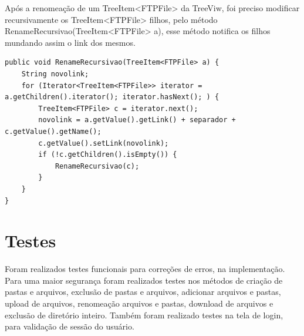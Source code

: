 \documentclass[12pt]{article}
\begin{document}
	Após a renomeação de um TreeItem<FTPFile> da TreeViw, foi preciso modificar recursivamente os TreeItem<FTPFile> filhos, pelo método RenameRecursivao(TreeItem<FTPFile> a), esse método notifica os filhos mundando assim o link dos mesmos.
\begin{lstlisting}
public void RenameRecursivao(TreeItem<FTPFile> a) {
	String novolink;
	for (Iterator<TreeItem<FTPFile>> iterator = a.getChildren().iterator(); iterator.hasNext(); ) {
		TreeItem<FTPFile> c = iterator.next();
		novolink = a.getValue().getLink() + separador + c.getValue().getName();
		c.getValue().setLink(novolink);
		if (!c.getChildren().isEmpty()) {
			RenameRecursivao(c);
		}
	}
}
\end{lstlisting}

\section{Testes}
Foram realizados testes funcionais para correções de erros, na implementação. Para uma maior segurança foram realizados testes nos métodos de criação de pastas e arquivos, exclusão de pastas e arquivos, adicionar arquivos e pastas, upload de arquivos, renomeação arquivos e pastas, download de arquivos e exclusão de diretório inteiro. Também foram realizado testes na tela de login, para validação de sessão do usuário.

 
\end{document}
